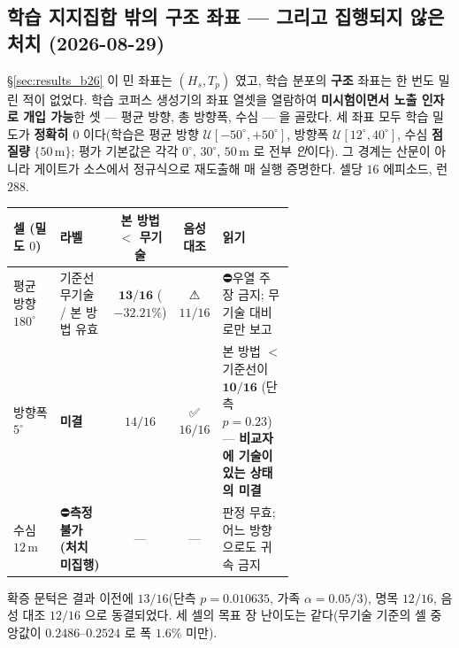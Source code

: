 \documentclass[11pt]{report}
\numberwithin{equation}{chapter}
\numberwithin{figure}{chapter}
\numberwithin{table}{chapter}
\begin{document}
\subsection{학습 지지집합 밖의 구조 좌표 --- 그리고 집행되지 않은 처치 (2026-08-29)}
\label{sec:results_m3}

\S\ref{sec:results_b26} 이 민 좌표는 $(H_s, T_p)$ 였고, 학습 분포의 \textbf{구조} 좌표는
한 번도 밀린 적이 없었다. 학습 코퍼스 생성기의 좌표 열셋을 열람하여 \textbf{미시험이면서
노출 인자로 개입 가능}한 셋 --- 평균 방향, 총 방향폭, 수심 --- 을 골랐다. 세 좌표 모두
학습 밀도가 \textbf{정확히 $0$} 이다(학습은 평균 방향 $\mathcal{U}[-50^\circ, +50^\circ]$,
방향폭 $\mathcal{U}[12^\circ, 40^\circ]$, 수심 \textbf{점질량} $\{50\,\mathrm{m}\}$; 평가
기본값은 각각 $0^\circ$, $30^\circ$, $50$\,m 로 전부 \emph{안}이다). 그 경계는 산문이 아니라
게이트가 소스에서 정규식으로 재도출해 매 실행 증명한다. 셀당 $16$ 에피소드, 런 $288$.

\begin{center}
\small
\begin{tabular}{p{0.17\linewidth}p{0.20\linewidth}ccp{0.26\linewidth}}
\toprule
셀 (밀도 $0$) & 라벨 & 본 방법 $<$ 무기술 & 음성 대조 & 읽기 \\
\midrule
평균 방향 $180^\circ$ & 기준선 무기술 / 본 방법 유효 & $\mathbf{13/16}$ ($-32.21\%$) & ⚠$11/16$ & ⛔우열 주장 금지; 무기술 대비로만 보고 \\
방향폭 $5^\circ$ & \textbf{미결} & $14/16$ & ✅$16/16$ & 본 방법 $<$ 기준선이 $\mathbf{10/16}$ (단측 $p = 0.23$) --- \textbf{비교자에 기술이 있는 상태의 미결} \\
수심 $12$\,m & ⛔\textbf{측정 불가 (처치 미집행)} & --- & --- & 판정 무효; 어느 방향으로도 귀속 금지 \\
\bottomrule
\end{tabular}
\end{center}
\noindent
확증 문턱은 결과 이전에 $13/16$(단측 $p = 0.010635$, 가족 $\alpha = 0.05/3$), 명목 $12/16$,
음성 대조 $12/16$ 으로 동결되었다. 세 셀의 목표 장 난이도는 같다(무기술 기준의 셀 중앙값이
$0.2486$--$0.2524$ 로 폭 $1.6\%$ 미만).
\end{document}
